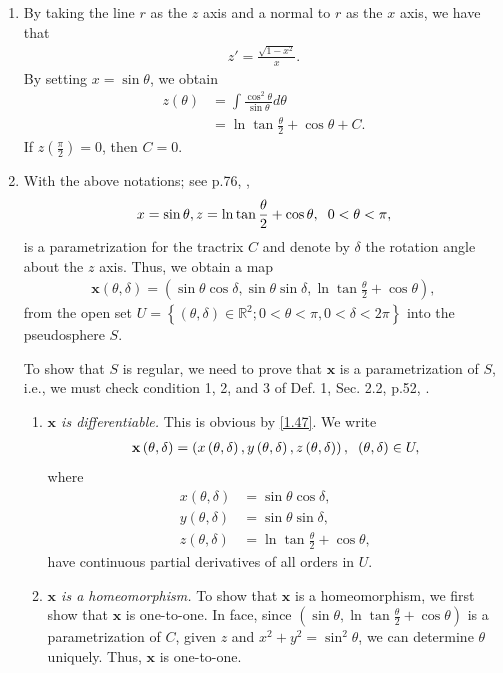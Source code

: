 \documentclass[a4paper]{article}
\numberwithin{equation}{section}
\begin{document}
\begin{enumerate}
\item By taking the line $r$ as the $z$ axis and a normal to $r$ as the $x$ axis, we have that
\begin{align}
\label{1.43}
z' = \frac{{\sqrt {1 - {x^2}} }}{x}.
\end{align}
By setting $x= \sin \theta$, we obtain
\begin{align}
z\left( \theta  \right) &= \int {\frac{{{{\cos }^2}\theta }}{{\sin \theta }}d\theta } \\
 &= \ln \tan \frac{\theta }{2} + \cos \theta  + C.
\end{align}
If $z\left(\frac{\pi}{2}\right) =0$, then $C=0$.
\item With the above notations; see p.76, \cite{1},
\begin{align}
x = \sin \theta ,z = \ln \tan \frac{\theta }{2} + \cos \theta ,\hspace{0.2cm}0 < \theta  < \pi ,
\end{align}
is a parametrization for the tractrix $C$ and denote by $\delta $ the rotation angle about the $z$ axis. Thus, we obtain a map
\begin{align}
\label{1.47}
\mathbf{x} \left( {\theta ,\delta } \right) = \left( {\sin \theta \cos \delta ,\sin \theta \sin \delta ,\ln \tan \frac{\theta }{2} + \cos \theta } \right),
\end{align}
from the open set $U = \left\{ {\left( {\theta ,\delta } \right) \in {\mathbb{R}^2};0 < \theta  < \pi ,0 < \delta  < 2\pi } \right\}$  into the pseudosphere $S$. 

To show that $S$ is regular, we need to prove that $\mathbf{x}$ is a parametrization of $S$, i.e., we must check condition 1, 2, and 3 of Def. 1, Sec. 2.2, p.52, \cite{1}. 
\begin{enumerate}
\item \textit{$\mathbf{x}$ is differentiable.} This is obvious by \eqref{1.47}. We write 
\begin{align}
\mathbf{x} \left( {\theta ,\delta } \right) = \left( {x\left( {\theta ,\delta } \right),y\left( {\theta ,\delta } \right),z\left( {\theta ,\delta } \right)} \right), \hspace{0.2cm} \left( {\theta ,\delta } \right) \in U,
\end{align}
where 
\begin{align}
x\left( {\theta ,\delta } \right) &= \sin \theta \cos \delta ,\\
y\left( {\theta ,\delta } \right) &= \sin \theta \sin \delta ,\\
z\left( {\theta ,\delta } \right) &= \ln \tan \frac{\theta }{2} + \cos \theta ,
\end{align}
have continuous partial derivatives of all orders in $U$.
\item \textit{$\mathbf{x}$ is a homeomorphism.} To show that $\mathbf{x}$ is a homeomorphism, we first show that $\mathbf{x}$ is one-to-one. In face, since $\left( {\sin \theta ,\ln \tan \frac{\theta }{2} + \cos \theta } \right)$ is a parametrization of $C$, given $z$ and ${x^2} + {y^2} = {\sin ^2}\theta $, we can determine $\theta$ uniquely. Thus, $\mathbf{x}$ is one-to-one. 


\end{enumerate}
\end{enumerate}
\end{document}
